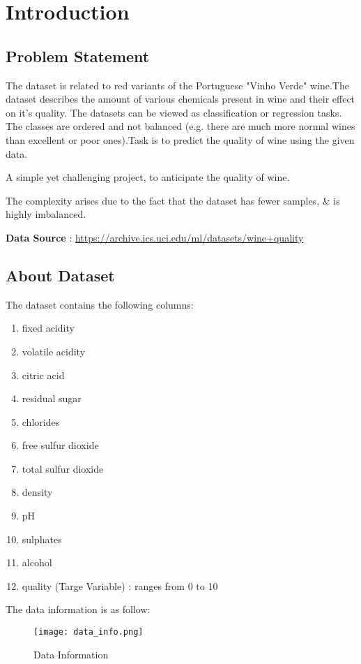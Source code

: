 \chapter{Introduction}
\section{Problem Statement}
The dataset is related to red variants of the Portuguese "Vinho Verde" wine.The dataset describes the amount of various chemicals present in wine and their effect on it's quality. The datasets can be viewed as classification or regression tasks. The classes are ordered and not balanced (e.g. there are much more normal wines than excellent or poor ones).Task is to predict the quality of wine using the given data.

A simple yet challenging project, to anticipate the quality of wine.

The complexity arises due to the fact that the dataset has fewer samples, \& is highly imbalanced.

\textbf{Data Source} : \href{https://archive.ics.uci.edu/ml/datasets/wine+quality}{https://archive.ics.uci.edu/ml/datasets/wine+quality}

\section{About Dataset}
The dataset contains the following columns:
\begin{enumerate}
    \item fixed acidity
    \item volatile acidity
    \item citric acid
    \item residual sugar
    \item chlorides
    \item free sulfur dioxide
    \item total sulfur dioxide
    \item density
    \item pH
    \item sulphates
    \item alcohol
    \item quality (Targe Variable) : ranges from 0 to 10
\end{enumerate}

The data information is as follow:
\begin{figure}[H]
    \centering
    \texttt{[image: data\_info.png]}
    \caption{Data Information}
    \label{fig:Data Information}
\end{figure}

